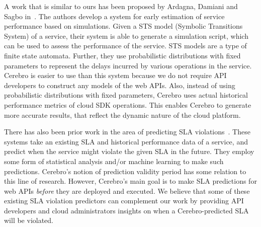 A work that is similar to ours has been proposed by Ardagna, Damiani and Sagbo in~\cite{6649675}. 
The authors develop
a system for early estimation of service performance based on simulations. Given a STS
model (Symbolic Transitions System) of a service, their system is able to generate a simulation script, which
can be used to assess the performance of the service. STS models are a type of finite state automata. 
Further, they use probabilistic distributions with fixed parameters
to represent the delays incurred by various operations in the service. Cerebro is easier to use than this
system because we do not require API developers to construct any models of the web APIs. 
Also, instead of using probabilistic distributions
with fixed parameters, Cerebro uses actual historical performance metrics of cloud SDK operations. This enables
Cerebro to generate more accurate results, that reflect the dynamic nature of the cloud platform.

There has also been prior work in the area of predicting 
SLA violations~\cite{Leitner10,6976585,Duan:2006:PIP:1142473.1142582}. 
These systems take an existing SLA and historical performance data of a service, and predict when the 
service might violate the given SLA in the future. They employ some form of statistical analysis and/or machine learning to
make such predictions. Cerebro's notion of prediction validity period has some relation to this line of research. However,
Cerebro's main goal is to make SLA predictions for web APIs \textit{before} 
they are deployed and executed. We believe that
some of these existing SLA violation predictors can complement our 
work by providing API developers and cloud
administrators insights on when a Cerebro-predicted SLA will be violated.
